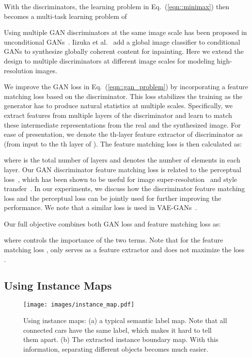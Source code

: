 \documentclass[10pt,twocolumn,letterpaper]{article}
\newcommand{\lblfig}[1]{\label{fig:#1}}
\newcommand{\lblsec}[1]{\label{sec:#1}}
\begin{document}
With the discriminators, the learning problem in Eq.~(\ref{eqn::minimax}) then becomes a multi-task learning problem of 

Using multiple GAN discriminators at the same image scale has been proposed in unconditional GANs~\cite{durugkar2016generative}. Iizuka et al.~\cite{iizuka2017globally} add a global image classifier to conditional GANs to synthesize globally coherent content for inpainting.
Here we extend the design to multiple discriminators at different image scales for modeling high-resolution images. 

 We improve the GAN loss in Eq.~(\ref{eqn::gan_problem}) by incorporating a feature matching loss based on the discriminator. This loss stabilizes the training as the generator has to produce natural statistics at multiple scales. Specifically, we extract features from multiple layers of the discriminator and learn to match these intermediate representations from the real and the synthesized image. For ease of presentation, we denote the th-layer feature extractor of discriminator  as  (from input to the th layer of ). The feature matching loss  is then calculated as:

where  is the total number of layers and  denotes the number of elements in each layer.  Our GAN discriminator feature matching loss is related to the perceptual loss~\cite{gatys2016image,johnson2016perceptual,dosovitskiy2016generating}, which has been shown to be useful for image super-resolution~\cite{ledig2016photo} and style transfer~\cite{johnson2016perceptual}. 
In our experiments, we discuss how the discriminator feature matching loss and the perceptual loss can be jointly used for further improving the performance. 
We note that a similar loss is used in VAE-GANs~\cite{larsen2015autoencoding}.

Our full objective combines both GAN loss and feature matching loss as:

where  controls the importance of the two terms. Note that for the feature matching loss ,  only serves as a feature extractor and does not maximize the loss .

\subsection{Using Instance Maps} \lblsec{alg:inst}
\begin{figure}
  \centering
  \texttt{[image: images/instance\_map.pdf]}   
  \caption{Using instance maps: (a) a typical semantic label map. Note that all connected cars have the same label, which makes it hard to tell them apart.
  (b) The extracted instance boundary map. With this information, separating different objects becomes much easier.
  }  
  \lblfig{inst}
\end{figure}
\end{document}
